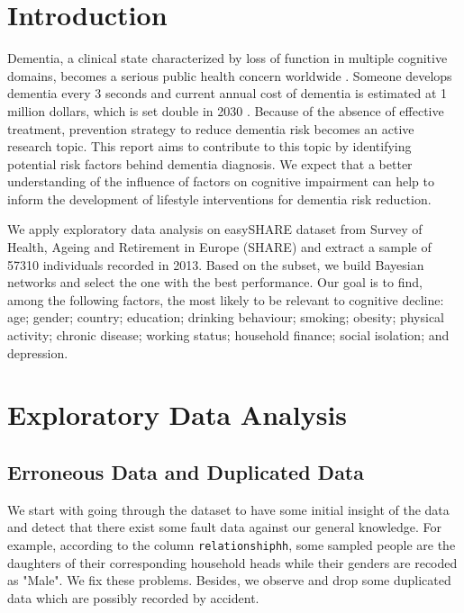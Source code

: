 \documentclass[11pt,twoside]{article}
\numberwithin{Theorem}{section}
\numberwithin{Definition}{section}
\numberwithin{Lemma}{section}
\numberwithin{Algorithm}{section}
\numberwithin{equation}{section}
\begin{document}
\tableofcontents

\setcounter{page}{1}

\nocite{*}

\clearpage

\section{Introduction}
\label{sec:intro}

Dementia, a clinical state characterized by loss of function in multiple cognitive domains, becomes a serious public health concern worldwide \cite{seixas2014bayesian}. Someone develops dementia every 3 seconds and current annual cost of dementia is estimated at 1 million dollars, which is set double in 2030 \cite{alzheimer2019world}. Because of the absence of effective treatment, prevention strategy to reduce dementia risk becomes an active research topic. This report aims to contribute to this topic by identifying potential risk factors behind dementia diagnosis. We expect that a better understanding of the influence of factors on cognitive impairment can help to inform the development of lifestyle interventions for dementia risk reduction. 

We apply exploratory data analysis on easySHARE dataset from Survey of Health, Ageing and Retirement in Europe (SHARE) and extract a sample of 57310 individuals recorded in 2013. Based on the subset, we build Bayesian networks and select the one with the best performance. Our goal is to find, among the following factors, the most likely to be relevant to cognitive decline: age; gender; country; education; drinking behaviour; smoking; obesity; physical activity; chronic disease; working status; household finance; social isolation; and depression. 

\section{Exploratory Data Analysis}  
\label{sec: EDA}

\subsection{Erroneous Data and Duplicated Data}

We start with going through the dataset to have some initial insight of the data and detect that there exist some fault data against our general knowledge. For example, according to the column \texttt{relationshiphh}, some sampled people are the daughters of their corresponding household heads while their genders are recoded as "Male". We fix these problems. Besides, we observe and drop some duplicated data which are possibly recorded by accident. 
\end{document}
